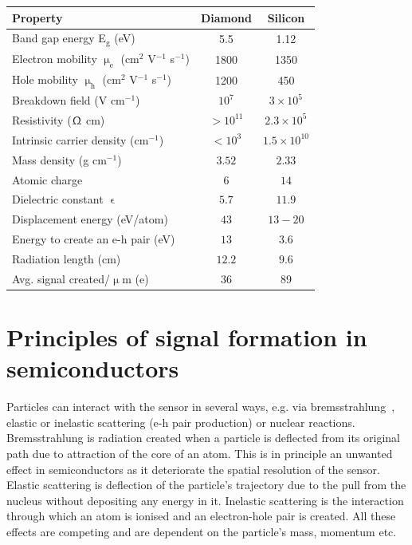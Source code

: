 \begin{footnotesize}
\begin{center}
\begin{tabular}{   l  c  c   }
\hline
Property & Diamond & Silicon \\
\hline
Band gap energy E$_\mathrm{g}$ (eV) & 5.5 & 1.12  \\
Electron mobility $\upmu_\mathrm{e}$ (cm$^2$ V$^{-1}$ s$^{-1}$) & 1800 & 1350 \\
Hole mobility $\upmu_\mathrm{h}$ (cm$^2$ V$^{-1}$ s$^{-1}$) & 1200 & 450 \\
Breakdown field (V cm$^{-1}$) & $10^{7}$ & $3\times 10^5$ \\
Resistivity ($\Upomega$ cm) & $>10^{11}$  & $2.3\times 10^5$  \\
Intrinsic carrier density (cm$^{-1}$) & $<10^3$ & $1.5\times 10^{10} $ \\
Mass density (g cm$^{-1}$) & $ 3.52$ & $2.33 $ \\
Atomic charge  & $6 $ & $ 14$ \\
Dielectric constant $\upvarepsilon$ & $5.7 $ & $11.9 $ \\
Displacement energy (eV/atom) & $43 $ & $13-20 $ \\
Energy to create an e-h pair  (eV) & $13 $ & $ 3.6$ \\
Radiation length (cm) & $ 12.2$ & $9.6 $ \\
Avg. signal created/$\upmu$m (e) & 36 & 89 \\\hline
\end{tabular}
\label{tab:semicompare}
\end{center}
\end{footnotesize}


\section{Principles of signal formation in semiconductors}
\label{sec:princsigfor}
Particles can interact with the sensor in several ways, e.g. via bremsstrahlung~\cite{}, elastic or inelastic scattering (e-h pair production) or nuclear reactions. Bremsstrahlung is radiation created when a particle is deflected from its original path due to attraction of the core of an atom. This is in principle an unwanted effect in semiconductors as it deteriorate the spatial resolution of the sensor. Elastic scattering is deflection of the particle's trajectory due to the pull from the nucleus without depositing any energy in it. Inelastic scattering is the interaction through which an atom is ionised and an electron-hole pair is created. All these effects are competing and are dependent on the particle's mass, momentum etc. 


